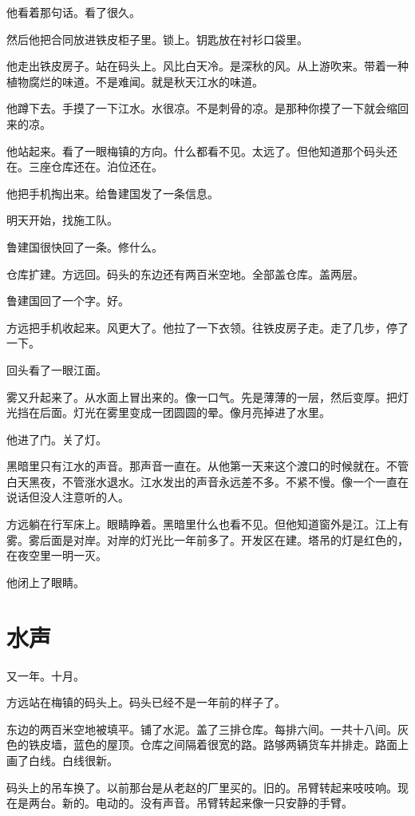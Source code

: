 \documentclass[UTF8,a5paper,11pt,openany]{ctexbook}
\begin{document}
他看着那句话。看了很久。

然后他把合同放进铁皮柜子里。锁上。钥匙放在衬衫口袋里。

他走出铁皮房子。站在码头上。风比白天冷。是深秋的风。从上游吹来。带着一种植物腐烂的味道。不是难闻。就是秋天江水的味道。

他蹲下去。手摸了一下江水。水很凉。不是刺骨的凉。是那种你摸了一下就会缩回来的凉。

他站起来。看了一眼梅镇的方向。什么都看不见。太远了。但他知道那个码头还在。三座仓库还在。泊位还在。

他把手机掏出来。给鲁建国发了一条信息。

明天开始，找施工队。

鲁建国很快回了一条。修什么。

仓库扩建。方远回。码头的东边还有两百米空地。全部盖仓库。盖两层。

鲁建国回了一个字。好。

方远把手机收起来。风更大了。他拉了一下衣领。往铁皮房子走。走了几步，停了一下。

回头看了一眼江面。

雾又升起来了。从水面上冒出来的。像一口气。先是薄薄的一层，然后变厚。把灯光挡在后面。灯光在雾里变成一团圆圆的晕。像月亮掉进了水里。

他进了门。关了灯。

黑暗里只有江水的声音。那声音一直在。从他第一天来这个渡口的时候就在。不管白天黑夜，不管涨水退水。江水发出的声音永远差不多。不紧不慢。像一个一直在说话但没人注意听的人。

方远躺在行军床上。眼睛睁着。黑暗里什么也看不见。但他知道窗外是江。江上有雾。雾后面是对岸。对岸的灯光比一年前多了。开发区在建。塔吊的灯是红色的，在夜空里一明一灭。

他闭上了眼睛。

\clearpage

\chapter{水声}
\indent
又一年。十月。

方远站在梅镇的码头上。码头已经不是一年前的样子了。

东边的两百米空地被填平。铺了水泥。盖了三排仓库。每排六间。一共十八间。灰色的铁皮墙，蓝色的屋顶。仓库之间隔着很宽的路。路够两辆货车并排走。路面上画了白线。白线很新。

码头上的吊车换了。以前那台是从老赵的厂里买的。旧的。吊臂转起来吱吱响。现在是两台。新的。电动的。没有声音。吊臂转起来像一只安静的手臂。
\end{document}
